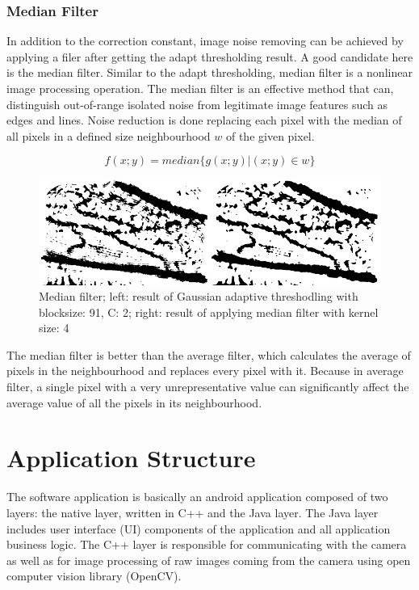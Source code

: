 \subsubsection{Median Filter}
In addition to the correction constant, image noise removing can be achieved by applying a filer after getting the adapt thresholding result. A good candidate here is the median filter. Similar to the adapt thresholding, median filter is a nonlinear image processing operation. The median filter is an effective method that can, distinguish out-of-range isolated noise from legitimate image features such as edges and lines. Noise reduction is done replacing each pixel with the median of all pixels in a defined size neighbourhood $w$ of the given pixel. 

\begin{equation}
f(x; y) = median \{g(x; y) | (x; y)\in w   \}
\end{equation}


\begin{figure}[H]
\centering
\includegraphics[scale=0.8]{figures/compare5.JPG}
\captionsetup{justification=centering}

\caption[Median filter]{Median filter; left: result of Gaussian adaptive threshodling with blocksize: 91, C: 2; right: result of applying median filter with kernel size: 4}\label{fig:compare5}
\end{figure}


The median filter is better than the average filter, which calculates the average of pixels in the neighbourhood and replaces every pixel with it. Because in average filter, a single pixel with a very unrepresentative value can significantly affect the average value of all the pixels in its neighbourhood. 


\section{Application Structure}
The software application is basically an android application composed of two layers: the native layer, written in C++ and the Java layer. 
The Java layer includes user interface (UI) components of the application and all application business logic. 
The C++ layer is responsible for communicating with the camera as well as for image processing of raw images coming from the camera using open computer vision library (OpenCV).

